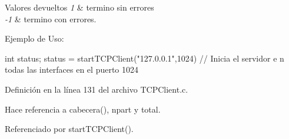 \begin{DoxyRetVals}{Valores devueltos}
{\em 1} & termino sin errores \\
\hline
{\em -\/1} & termino con errores.\\
\hline
\end{DoxyRetVals}
Ejemplo de Uso: 
\begin{DoxyCode}
                int status;
                status = startTCPClient("127.0.0.1",1024) // Inicia el servidor e
      n todas las interfaces en el puerto 1024
\end{DoxyCode}
 

Definición en la línea 131 del archivo TCPClient.c.



Hace referencia a cabecera(), npart y total.



Referenciado por startTCPClient().


